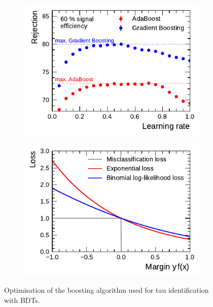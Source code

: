 \begin{figure}[htb]
  \centering
  \begin{subfigure}[t]{0.48\textwidth}
    \centering
    \includegraphics{./figures/bdt_perf/boosting.pdf}
    \label{fig:bdt_boosting_alg}
  \end{subfigure}\hfill
  \begin{subfigure}[t]{0.48\textwidth}
    \centering
    \includegraphics{./figures/theory/boosting_loss.pdf}
    \label{fig:boosting_loss}
  \end{subfigure}
  \caption[Optimisation of the boosting algorithm]{Optimisation of the boosting
    algorithm used for tau identification with BDTs.}
\end{figure}


